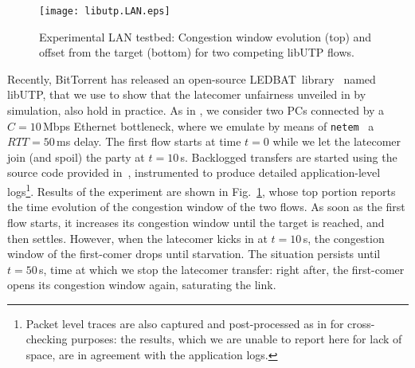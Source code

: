 \documentclass[conference]{IEEEtran}
\newcommand{\figR}[1]{Fig.~\ref{fig:#1}}
\newcommand{\figLC}[2]{
        \caption{#2}
        \label{fig:#1}
        \vspace{-5pt}
}
\newcommand{\btledbat}[0]{LEDBAT}
\begin{document}
\begin{figure}[t]
\centering
        \texttt{[image: libutp.LAN.eps]}
	\figLC{motivation}{Experimental LAN testbed: Congestion window evolution (top) and offset from the target (bottom) for two competing libUTP flows.}
\end{figure}




Recently, BitTorrent has released an open-source \btledbat\ library~\cite{libutp_code} named libUTP, that we use to show that the latecomer unfairness unveiled in \cite{icccn10} by simulation, also hold in practice. As in \cite{icccn10}, we consider two PCs connected by a $C=10$\,Mbps Ethernet bottleneck, where we emulate by means of \texttt{netem}~\cite{netem} a $RTT=50$\,ms delay.
The first flow starts at time $t=0$ while we let the latecomer join (and spoil) the party at $t=10$\,s. Backlogged transfers are started using the source code provided in~\cite{libutp_code}, instrumented to produce detailed application-level logs\footnote{Packet level traces are also captured and post-processed as in \cite{pam10} for cross-checking purposes: the results, which we are unable to report here for lack of space, are in agreement with the application logs.}.
Results of the experiment are shown in \figR{motivation}, whose top portion reports the time evolution of the congestion window of the two flows. As soon as the first flow starts, it increases its congestion window until the target is reached, and then settles. However, when the latecomer kicks in at $t=10$\,s, the congestion window of the first-comer drops until starvation. The situation persists until $t=50$\,s, time at which we stop the latecomer transfer: right after, the first-comer opens its congestion window again, saturating the link.
\end{document}
